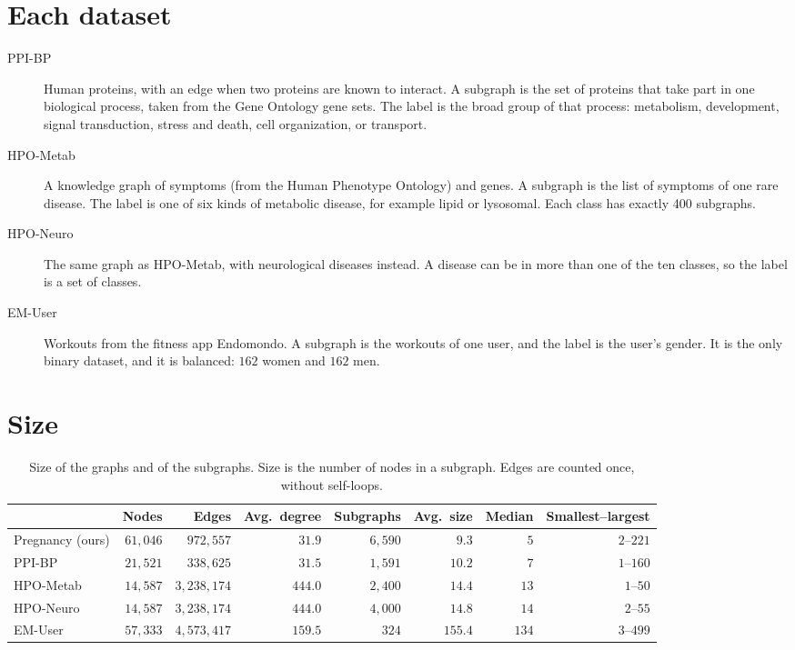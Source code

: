 \documentclass[11pt]{article}
\begin{document}
\section*{Each dataset}

\begin{description}
\item[PPI-BP] Human proteins, with an edge when two proteins are known to interact. A
subgraph is the set of proteins that take part in one biological process, taken from the
Gene Ontology gene sets. The label is the broad group of that process: metabolism,
development, signal transduction, stress and death, cell organization, or transport.
\item[HPO-Metab] A knowledge graph of symptoms (from the Human Phenotype Ontology) and genes.
A subgraph is the list of symptoms of one rare disease. The label is one of six kinds of
metabolic disease, for example lipid or lysosomal. Each class has exactly 400 subgraphs.
\item[HPO-Neuro] The same graph as HPO-Metab, with neurological diseases instead. A disease
can be in more than one of the ten classes, so the label is a set of classes.
\item[EM-User] Workouts from the fitness app Endomondo. A subgraph is the workouts of one
user, and the label is the user's gender. It is the only binary dataset, and it is balanced:
$162$ women and $162$ men.
\end{description}

\section*{Size}

\begin{table}[H]
\centering
\small
\begin{tabular}{lrrrrrrr}
\toprule
 & Nodes & Edges & Avg.\ degree & Subgraphs & Avg.\ size & Median & Smallest--largest \\
\midrule
Pregnancy (ours) & $61{,}046$ & $972{,}557$ & $31.9$ & $6{,}590$ & $9.3$ & $5$ & $2$--$221$ \\
\addlinespace
PPI-BP & $21{,}521$ & $338{,}625$ & $31.5$ & $1{,}591$ & $10.2$ & $7$ & $1$--$160$ \\
HPO-Metab & $14{,}587$ & $3{,}238{,}174$ & $444.0$ & $2{,}400$ & $14.4$ & $13$ & $1$--$50$ \\
HPO-Neuro & $14{,}587$ & $3{,}238{,}174$ & $444.0$ & $4{,}000$ & $14.8$ & $14$ & $2$--$55$ \\
EM-User & $57{,}333$ & $4{,}573{,}417$ & $159.5$ & $324$ & $155.4$ & $134$ & $3$--$499$ \\
\bottomrule
\end{tabular}
\caption{Size of the graphs and of the subgraphs. Size is the number of nodes in a subgraph.
Edges are counted once, without self-loops.}
\end{table}
\end{document}
